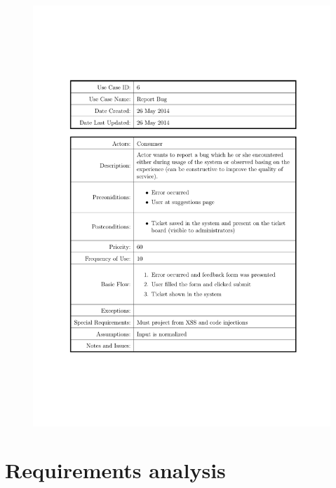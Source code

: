 \documentclass[a4paper]{tufte-book}
\begin{document}
\begin{figure}[h] \includegraphics[width=\linewidth]{Requirements/UseCases/006_ReportBug.pdf}\end{figure}


\chapter{Requirements analysis}
\end{document}
